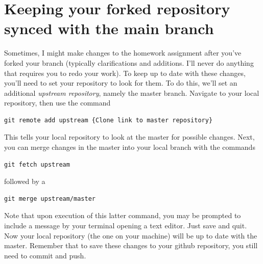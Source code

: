 \documentclass{article}
\begin{document}
\newpage

\section{Keeping your forked repository synced with the main branch}
Sometimes, I might make changes to the homework assignment after you've forked your branch (typically clarifications and additions.  I'll never do anything that requires you to redo your work).  To keep up to date with these changes, you'll need to set your repository to look for them.  To do this, we'll set an additional \emph{upstream repository}, namely the master branch.  Navigate to your local repository, then use the command
\begin{verbatim}
git remote add upstream {Clone link to master repository}
\end{verbatim}
This tells your local repository to look at the master for possible changes.  Next, you can merge changes in the master into your local branch with the commands
\begin{verbatim}
git fetch upstream
\end{verbatim}
followed by a
\begin{verbatim}
git merge upstream/master
\end{verbatim}
Note that upon execution of this latter command, you may be prompted to include a message by your terminal opening a text editor.  Just save and quit.  Now your local repository (the one on your machine) will be up to date with the master.  Remember that to save these changes to your github repository, you still need to commit and push.
\end{document}
